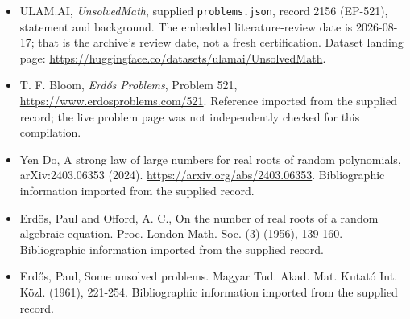 \documentclass[11pt,a4paper]{article}
\begin{document}
{\small

\begin{itemize}

\item[\hypertarget{source:2156:1}{S1}] ULAM.AI, \emph{UnsolvedMath}, supplied \texttt{problems.json}, record 2156 (EP-521), statement and background. The embedded literature-review date is 2026-08-17; that is the archive’s review date, not a fresh certification. Dataset landing page: \url{https://huggingface.co/datasets/ulamai/UnsolvedMath}.

\item[\hypertarget{source:2156:2}{S2}] T. F. Bloom, \emph{Erdős Problems}, Problem 521, \url{https://www.erdosproblems.com/521}. Reference imported from the supplied record; the live problem page was not independently checked for this compilation.

\item[\hypertarget{source:2156:3}{S3}] Yen Do, A strong law of large numbers for real roots of random polynomials, arXiv:2403.06353 (2024). \url{https://arxiv.org/abs/2403.06353}. Bibliographic information imported from the supplied record.

\item[\hypertarget{source:2156:4}{S4}] Erd\"{o}s, Paul and Offord, A. C., On the number of real roots of a random algebraic equation. Proc. London Math. Soc. (3) (1956), 139-160. Bibliographic information imported from the supplied record.

\item[\hypertarget{source:2156:5}{S5}] Erd\H{o}s, Paul, Some unsolved problems. Magyar Tud. Akad. Mat. Kutat\'{o} Int. K\"{o}zl. (1961), 221-254. Bibliographic information imported from the supplied record.

\end{itemize}

}

\label{end:2156}
\end{document}
